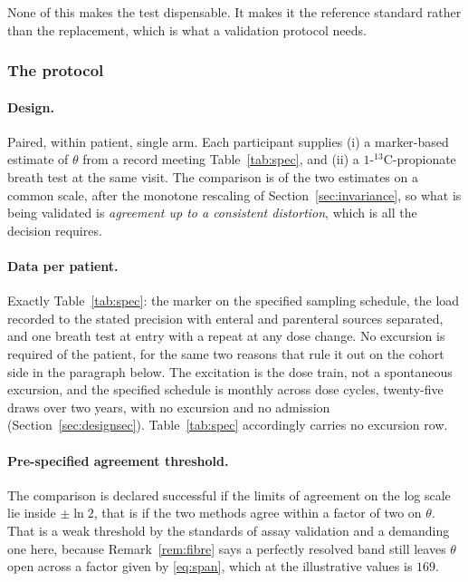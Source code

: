 None of this makes the test dispensable. It makes it the reference standard rather
than the replacement, which is what a validation protocol needs.

\subsubsection{The protocol}

\paragraph{Design.} Paired, within patient, single arm. Each participant supplies (i) a
marker-based estimate of $\theta$ from a record meeting Table~\ref{tab:spec}, and (ii) a
$1$-$^{13}$C-propionate breath test at the same visit. The comparison is of the two
estimates on a common scale, after the monotone rescaling of Section~\ref{sec:invariance},
so what is being validated is \emph{agreement up to a consistent distortion}, which is all
the decision requires.

\paragraph{Data per patient.} Exactly Table~\ref{tab:spec}: the marker on the specified
sampling schedule, the load recorded to the stated precision with enteral and parenteral
sources separated, and one breath test at entry with a repeat at any dose change. No excursion is required of the
patient, for the same two reasons that rule it out on the cohort side in the paragraph
below. The excitation is the dose train, not a spontaneous excursion, and the specified
schedule is monthly across dose cycles, twenty-five draws over two years, with no excursion
and no admission (Section~\ref{sec:designsec}).
Table~\ref{tab:spec} accordingly carries no excursion row.

\paragraph{Pre-specified agreement threshold.} The comparison is declared successful if the
limits of agreement on the log scale lie inside $\pm \ln 2$, that is if the two methods
agree within a factor of two on $\theta$. That is a weak threshold by the standards of assay
validation and a demanding one here, because Remark~\ref{rem:fibre} says a perfectly
resolved band still leaves $\theta$ open across a factor given by \eqref{eq:span}, which at
the illustrative values is $169$.


